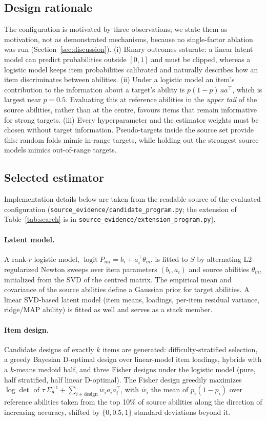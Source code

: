 \documentclass{article}
\begin{document}
\subsection{Design rationale}
The configuration is motivated by three observations; we state them as motivation, not as demonstrated mechanisms, because no single-factor ablation was run (Section~\ref{sec:discussion}).
(i) Binary outcomes saturate: a linear latent model can predict probabilities outside $[0,1]$ and must be clipped, whereas a logistic model keeps item probabilities calibrated and naturally describes how an item discriminates between abilities.
(ii) Under a logistic model an item's contribution to the information about a target's ability is $p(1-p)\,a a^{\top}$, which is largest near $p=0.5$. Evaluating this at reference abilities in the \emph{upper tail} of the source abilities, rather than at the centre, favours items that remain informative for strong targets.
(iii) Every hyperparameter and the estimator weights must be chosen without target information. Pseudo-targets inside the source set provide this: random folds mimic in-range targets, while holding out the strongest source models mimics out-of-range targets.

\subsection{Selected estimator}
Implementation details below are taken from the readable source of the evaluated configuration (\texttt{source\_evidence/candidate\_program.py}; the extension of Table~\ref{tab:search} is in \texttt{source\_evidence/extension\_program.py}).
\paragraph{Latent model.} A rank-$r$ logistic model, $\operatorname{logit}P_{mi}=b_i+a_i^{\top}\theta_m$, is fitted to $S$ by alternating L2-regularized Newton sweeps over item parameters $(b_i,a_i)$ and source abilities $\theta_m$, initialized from the SVD of the centred matrix. The empirical mean and covariance of the source abilities define a Gaussian prior for target abilities. A linear SVD-based latent model (item means, loadings, per-item residual variance, ridge/MAP ability) is fitted as well and serves as a stack member.

\paragraph{Item design.} Candidate designs of exactly $k$ items are generated: difficulty-stratified selection, a greedy Bayesian D-optimal design over linear-model item loadings, hybrids with a $k$-means medoid half, and three Fisher designs under the logistic model (pure, half stratified, half linear D-optimal). The Fisher design greedily maximizes $\log\det$ of $\tau\,\Sigma_\theta^{-1}+\sum_{i\in\text{design}} \bar w_i a_i a_i^{\top}$, with $\bar w_i$ the mean of $p_i(1-p_i)$ over reference abilities taken from the top 10\% of source abilities along the direction of increasing accuracy, shifted by $\{0,0.5,1\}$ standard deviations beyond it.
\end{document}
